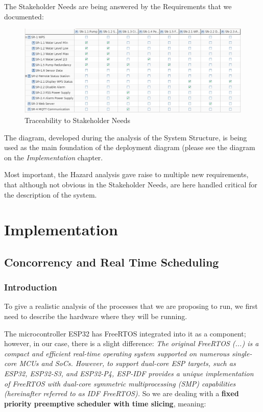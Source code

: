 \documentclass[11pt]{article}
\begin{document}
The Stakeholder Needs are being answered by the Requirements that we documented:

\begin{figure}[H]
  \centering
  \includegraphics[width=\linewidth]{../diagrams/traceability.png}
  \caption{Traceability to Stakeholder Needs}
  \label{fig:Traceability}
\end{figure}

The diagram, developed during the analysis of the System Structure, is being used as the main foundation of the deployment diagram (please see the diagram on the \textit{Implementation} chapter.

Most important, the Hazard analysis gave raise to multiple new requirements, that although not obvious in the Stakeholder Needs, are here handled critical for the description of the system.

\newpage
\section{Implementation}

\subsection{Concorrency and Real Time Scheduling}

\subsubsection{Introduction}

To give a realistic analysis of the processes that we are proposing to run, we first need to describe the hardware where they will be running.

The microcontroller ESP32 has FreeRTOS integrated into it as a component; however, in our case, there is a slight difference:
\newline
\newline
 \textit{The original FreeRTOS (...) is a compact and efficient real-time operating system supported on numerous single-core MCUs and SoCs. However, to support dual-core ESP targets, such as ESP32, ESP32-S3, and ESP32-P4, ESP-IDF provides a unique implementation of FreeRTOS with dual-core symmetric multiprocessing (SMP) capabilities (hereinafter referred to as IDF FreeRTOS).}\cite{c1}
\newline
\newline
So we are dealing with a \textbf{fixed priority preemptive scheduler with time slicing}, meaning:
\end{document}
